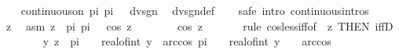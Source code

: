 \begin{isabellebody}
\isanewline
\ \ \isamarkupfalse%
\ {\isachardoublequoteopen}continuous{\isacharunderscore}{\kern0pt}on\ {\isacharbraceleft}{\kern0pt}pi{\isacharless}{\kern0pt}{\isachardot}{\kern0pt}{\isachardot}{\kern0pt}{\isacharless}{\kern0pt}{}{\isacharasterisk}{\kern0pt}\ pi\ {\isacharslash}{\kern0pt}\ {}{\isacharbraceright}{\kern0pt}\ dvsgn{\isachardoublequoteclose}\ \isamarkupfalse%
\ dvsgn{\isacharunderscore}{\kern0pt}def\isanewline
\ \ \isamarkupfalse%
\ {\isacharparenleft}{\kern0pt}safe\ intro{\isacharbang}{\kern0pt}{\isacharcolon}{\kern0pt}\ continuous{\isacharunderscore}{\kern0pt}intros{\isacharparenright}{\kern0pt}\isanewline
\ \ \ \ \isamarkupfalse%
\ z\ \isamarkupfalse%
\ asm{\isacharcolon}{\kern0pt}\ {\isachardoublequoteopen}z\ {\isasymin}\ {\isacharbraceleft}{\kern0pt}pi{\isacharless}{\kern0pt}{\isachardot}{\kern0pt}{\isachardot}{\kern0pt}{\isacharless}{\kern0pt}{}{\isacharasterisk}{\kern0pt}\ pi\ {\isacharslash}{\kern0pt}\ {}{\isacharbraceright}{\kern0pt}{\isachardoublequoteclose}\ {\isachardoublequoteopen}cos\ z\ {\isacharequal}{\kern0pt}\ {}{\isachardoublequoteclose}\isanewline
\ \ \ \ \isamarkupfalse%
\ {\isachardoublequoteopen}cos\ z\ {\isacharless}{\kern0pt}\ {}{\isachardoublequoteclose}\isanewline
\ \ \ \ \isamarkupfalse%
{\isacharparenleft}{\kern0pt}rule\ cos{\isacharunderscore}{\kern0pt}less{\isacharunderscore}{\kern0pt}iff{\isacharbrackleft}{\kern0pt}of\ {}\ z{\isacharcomma}{\kern0pt}\ THEN\ iffD{}{\isacharbrackright}{\kern0pt}{\isacharparenright}{\kern0pt}\isanewline
\ \ \ \ \ \ \isamarkupfalse%
\ {\isachardoublequoteopen}{\isasymexists}y{\isachardot}{\kern0pt}\ z\ {\isasymin}\ {\isacharbraceleft}{\kern0pt}pi\ {\isacharasterisk}{\kern0pt}\ {\isacharparenleft}{\kern0pt}{}\ {\isacharasterisk}{\kern0pt}\ real{\isacharunderscore}{\kern0pt}of{\isacharunderscore}{\kern0pt}int\ y{\isacharparenright}{\kern0pt}\ {\isacharplus}{\kern0pt}\ arccos\ {}{\isacharless}{\kern0pt}{\isachardot}{\kern0pt}{\isachardot}{\kern0pt}{\isacharless}{\kern0pt}pi\ {\isacharasterisk}{\kern0pt}\ {\isacharparenleft}{\kern0pt}{}\ {\isacharasterisk}{\kern0pt}\ {\isacharparenleft}{\kern0pt}real{\isacharunderscore}{\kern0pt}of{\isacharunderscore}{\kern0pt}int\ y\ {\isacharplus}{\kern0pt}\ {}{\isacharparenright}{\kern0pt}{\isacharparenright}{\kern0pt}\ {\isacharminus}{\kern0pt}\ arccos\ {}{\isacharbraceright}{\kern0pt}{\isachardoublequoteclose}\isanewline

\end{isabellebody}
